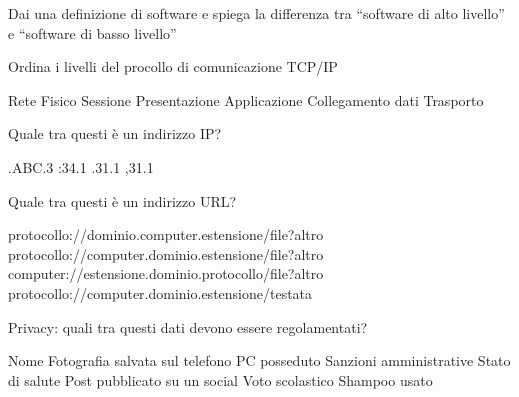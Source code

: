 \documentclass[addpoints]{exam}
\begin{document}
 
\begin{center}
\end{center}
 
\vspace{5mm}
 
 
\vspace{5mm}
 
 
\begin{questions}
	
\question[2] Dai una definizione di software e spiega la differenza tra “software di alto livello” e “software di basso livello”
\fillwithlines{1in}
 
\question[3] Ordina i livelli del procollo di comunicazione TCP/IP

\begin{multicols}{2}
	\begin{checkboxes}
		\choice Rete
		\choice Fisico
		\choice Sessione
		\choice Presentazione
		\choice Applicazione
		\choice Collegamento dati
		\choice Trasporto
	\end{checkboxes}
\end{multicols}
 
\question[1] Quale tra questi è un indirizzo IP?

\begin{oneparcheckboxes}
	.ABC.3
	:34.1
	.31.1
	,31.1
\end{oneparcheckboxes}

\question[1] Quale tra questi è un indirizzo URL?

\begin{oneparcheckboxes}
	\choice protocollo://dominio.computer.estensione/file?altro
	\choice protocollo://computer.dominio.estensione/file?altro
	\choice computer://estensione.dominio.protocollo/file?altro
	\choice protocollo://computer.dominio.estensione/testata
\end{oneparcheckboxes}

\question[1] Privacy: quali tra questi dati devono essere regolamentati?

\begin{oneparcheckboxes}
	\choice Nome
	\choice Fotografia salvata sul telefono
	\choice PC posseduto
	\choice Sanzioni amministrative
	\choice Stato di salute
	\choice Post pubblicato su un social
	\choice Voto scolastico
	\choice Shampoo usato
\end{oneparcheckboxes}


\end{questions}
\end{document}
